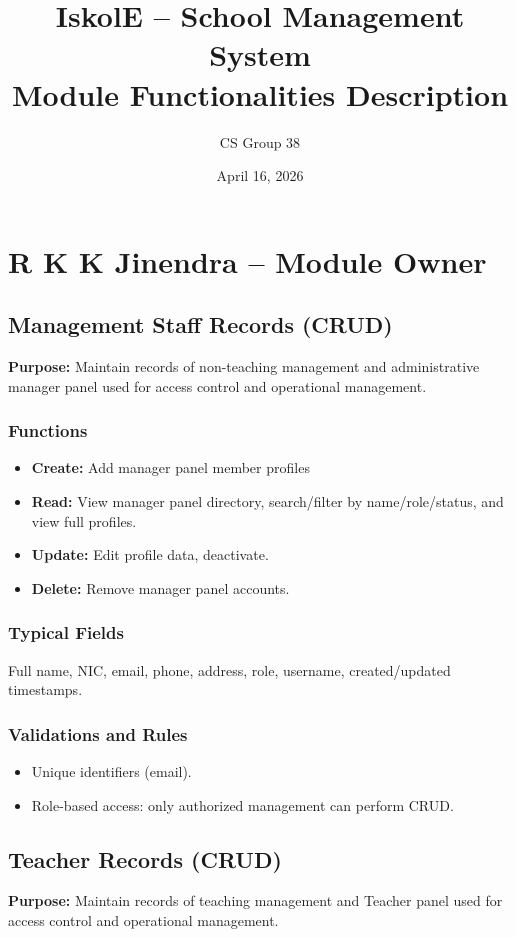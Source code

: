 \documentclass[12pt,a4paper]{article}
\title{IskolE -- School Management System\\\vspace{0.25em}\large Module Functionalities Description}
\author{CS Group 38}
\date{April 16, 2026}
\begin{document}
\maketitle


\section{R K K Jinendra -- Module Owner}

\subsection{Management Staff Records (CRUD)}
\textbf{Purpose:} Maintain records of non-teaching management and administrative manager panel used for access control and operational management.

\subsubsection*{Functions}
\begin{itemize}[leftmargin=*]
  \item \textbf{Create:} Add manager panel member profiles 
  \item \textbf{Read:} View manager panel directory, search/filter by name/role/status, and view full profiles.
  \item \textbf{Update:} Edit profile data, deactivate.
  \item \textbf{Delete:} Remove manager panel accounts.
\end{itemize}

\subsubsection*{Typical Fields}
 Full name, NIC, email, phone, address, role, username, created/updated timestamps.

\subsubsection*{Validations and Rules}
\begin{itemize}[leftmargin=*]
  \item Unique identifiers (email).
  \item Role-based access: only authorized management can perform CRUD.
\end{itemize}

\subsection{Teacher Records (CRUD)}
\textbf{Purpose:} Maintain records of teaching management and Teacher panel used for access control and operational management.
\end{document}
